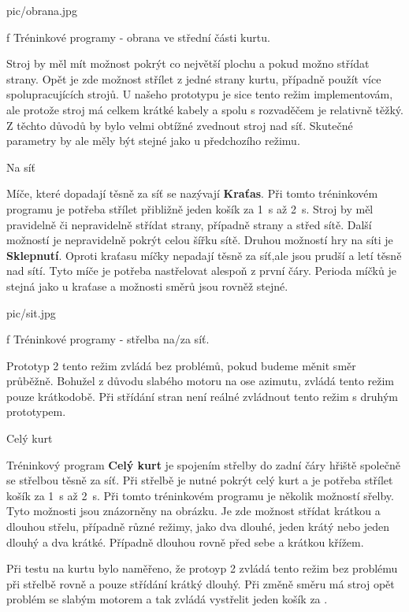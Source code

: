 \midinsert {}
\picheight=4cm \cinspic pic/obrana.jpg
\caption/f Tréninkové programy - obrana ve střední části kurtu.
\endinsert

Stroj by měl mít možnost pokrýt co největší plochu a pokud možno střídat strany. Opět je zde možnost střílet z jedné strany kurtu, případně použít více spolupracujících strojů. U našeho prototypu je sice tento režim implementovám, ale protože stroj má celkem krátké kabely a spolu s rozvaděčem je relativně těžký. Z těchto důvodů by bylo velmi obtížné zvednout stroj nad síť. Skutečné parametry by ale měly být stejné jako u předchozího režimu.

 
\sec Na síť 

Míče, které dopadají těsně za síť se nazývají {\bf Kraťas}. Při tomto tréninkovém programu je potřeba střílet přibližně jeden košík za 1~s až 2~s. Stroj by měl pravidelně či nepravidelně střídat strany, případně strany a střed sítě. Další možností je nepravidelně pokrýt celou šířku sítě. 
\nl
\nl
Druhou možností hry na síti je {\bf Sklepnutí}. Oproti kraťasu míčky nepadají těsně za síť,ale jsou prudší a letí těsně nad sítí. Tyto míče je potřeba nastřelovat alespoň z první čáry. Perioda míčků je stejná jako u kraťase a možnosti směrů jsou rovněž stejné.
\nl

\midinsert {}
\picheight=4cm \cinspic pic/sit.jpg
\caption/f Tréninkové programy - střelba na/za síť.
\endinsert

Prototyp 2 tento režim zvládá bez problémů, pokud budeme měnit směr průběžně. Bohužel z důvodu slabého motoru na ose azimutu, zvládá tento režim pouze krátkodobě. Při střídání stran není reálné zvládnout tento režim s druhým prototypem.

\sec Celý kurt

Tréninkový program {\bf Celý kurt} je spojením střelby do zadní čáry hřiště společně se střelbou těsně za síť. Při střelbě je nutné pokrýt celý kurt a je potřeba střílet košík za 1~s až 2~s. Při tomto tréninkovém programu je několik možností sřelby. Tyto možnosti jsou znázorněny na obrázku. Je zde možnost střídat krátkou a dlouhou střelu, případně různé režimy, jako dva dlouhé, jeden krátý nebo jeden dlouhý a dva krátké. Případně dlouhou rovně před sebe a krátkou křížem.

Při testu na kurtu bylo naměřeno, že protoyp 2 zvládá tento režim bez problému při střelbě rovně a pouze střídání krátký dlouhý. Při změně směru má stroj opět problém se slabým motorem a tak zvládá vystřelit jeden košík za .

